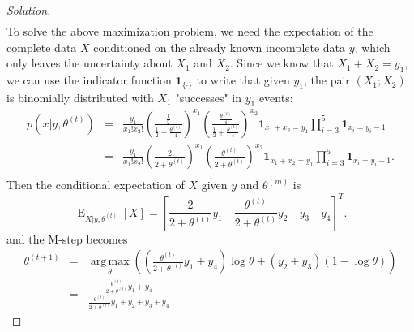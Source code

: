 \documentclass[11pt]{article}
\begin{document}
\begin{proof}[Solution]
\begin{eqnarray*}
\end{eqnarray*}
To solve the above maximization problem, we need the expectation
of the complete data $X$ conditioned on the already known incomplete
data $y$, which only leaves the uncertainty about $X_1$ and $X_2$. Since we
know that $X_1 + X_2 = y_1$, we can use the indicator function $\bm{1}_{\{\cdot\}}$ to
write that given $y_1$, the pair $(X_1;X_2)$ is binomially distributed with
$X_1$ "successes" in $y_1$ events:
\begin{eqnarray*}
p(x|y,\theta^{(t)}) &=& \frac{y_1}{x_1!x_2!}\left(\frac{\frac{1}{2}}{\frac{1}{2}+\frac{\theta^{(t)}}{4}}\right)^{x_1}\left(\frac{\frac{\theta^{(t)}}{4}}{\frac{1}{2}+\frac{\theta^{(t)}}{4}}\right)^{x_2}\bm{1}_{x_1+x_2=y_1}\prod_{i=3}^{5}\bm{1}_{x_i=y_i-1} \\
&=&\frac{y_1}{x_1!x_2!}\left(\frac{2}{2+\theta^{(t)}}\right)^{x_1}\left(\frac{\theta^{(t)}}{2+\theta^{(t)}}\right)^{x_2}\bm{1}_{x_1+x_2=y_1}\prod_{i=3}^{5}\bm{1}_{x_i=y_i-1}. \\
\end{eqnarray*}
Then the conditional expectation of $X$ given $y$ and $\theta^{(m)}$ is
$$
\operatorname{E}_{{X}|{y},\theta^{(t)}}\left[ X\right] = \left[\frac{2}{2+\theta^{(t)}}y_1 \quad \frac{\theta^{(t)}}{2+\theta^{(t)}}y_2 \quad y_3 \quad y_4 \right]^T.
$$
and the M-step becomes 
\begin{eqnarray*}
\theta^{(t+1)} &=& \underset{\theta}{\operatorname{arg\,max}}\left(\left( \frac{\theta^{(t)}}{2+\theta^{(t)}}y_1+y_4\right)\log\theta +(y_2+y_3)(1-\log\theta)\right) \\
&=& \frac{\frac{\theta^{(t)}}{2+\theta^{(t)}}y_1+y_4}{\frac{\theta^{(t)}}{2+\theta^{(t)}}y_1+y_2+y_3+y_4}
\end{eqnarray*}
\end{proof}
\end{document}

